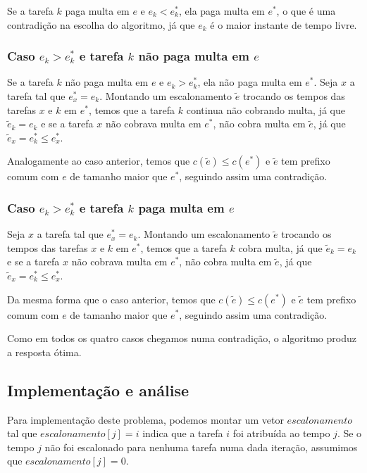 Se a tarefa $k$ paga multa em $e$ e $e_k < e^*_k$, ela paga multa em $e^*$, o que é uma contradição na escolha do algoritmo, já que $e_k$ é o maior instante de tempo livre.

\subsubsection*{Caso $e_k > e^*_k$ e tarefa $k$ não paga multa em $e$}

Se a tarefa $k$ não paga multa em $e$ e $e_k > e^*_k$, ela não paga multa em $e^*$. Seja $x$ a tarefa tal que $e^*_x = e_k$. Montando um escalonamento $\widetilde{e}$ trocando os tempos das tarefas $x$ e $k$ em $e^*$, temos que a tarefa $k$ continua não cobrando multa, já que $\widetilde{e}_k = e_k$ e se a tarefa $x$ não cobrava multa em $e^*$, não cobra multa em $\widetilde{e}$, já que $\widetilde{e}_x = e^*_k \leq e^*_x$.

Analogamente ao caso anterior, temos que $c(\widetilde{e}) \leq c(e^*)$ e $\widetilde{e}$ tem prefixo comum com $e$ de tamanho maior que $e^*$, seguindo assim uma contradição.

\subsubsection*{Caso $e_k > e^*_k$ e tarefa $k$ paga multa em $e$}

Seja $x$ a tarefa tal que $e^*_x = e_k$. Montando um escalonamento $\widetilde{e}$ trocando os tempos das tarefas $x$ e $k$ em $e^*$, temos que a tarefa $k$ cobra multa, já que $\widetilde{e}_k = e_k$ e se a tarefa $x$ não cobrava multa em $e^*$, não cobra multa em $\widetilde{e}$, já que $\widetilde{e}_x = e^*_k \leq e^*_x$.

Da mesma forma que o caso anterior, temos que $c(\widetilde{e}) \leq c(e^*)$ e $\widetilde{e}$ tem prefixo comum com $e$ de tamanho maior que $e^*$, seguindo assim uma contradição.

Como em todos os quatro casos chegamos numa contradição, o algoritmo produz a resposta ótima.

\subsection*{Implementação e análise}

Para implementação deste problema, podemos montar um vetor $escalonamento$ tal que $escalonamento[j] = i$ indica que a tarefa $i$ foi atribuída ao tempo $j$. Se o tempo $j$ não foi escalonado para nenhuma tarefa numa dada iteração, assumimos que $escalonamento[j] = 0$.

